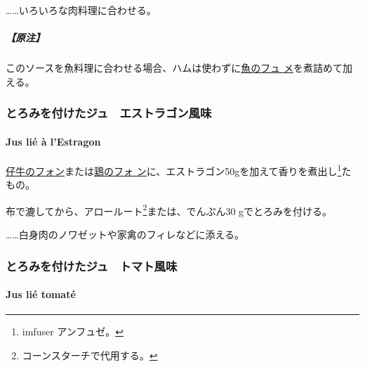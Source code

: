 \begin{recette}
\ldots{}\ldots{}いろいろな肉料理に合わせる。

\hypertarget{ux539fux6ce8-4}{%
\subparagraph{【原注】}\label{ux539fux6ce8-4}}

このソースを魚料理に合わせる場合、ハムは使わずに\protect\hyperlink{fumet-de-poisson}{魚のフュ
メ}を煮詰めて加える。

\maeaki

\hypertarget{ux3068ux308dux307fux3092ux4ed8ux3051ux305fux30b8ux30e5ux30a8ux30b9ux30c8ux30e9ux30b4ux30f3ux98a8ux5473}{%
\subsubsection{とろみを付けたジュ　エストラゴン風味}\label{ux3068ux308dux307fux3092ux4ed8ux3051ux305fux30b8ux30e5ux30a8ux30b9ux30c8ux30e9ux30b4ux30f3ux98a8ux5473}}

\hypertarget{jus-lie-a-lestragon}{%
\paragraph{Jus lié à l'Estragon}\label{jus-lie-a-lestragon}}

    

\protect\hyperlink{fonds-de-veau-brun}{仔牛のフォン}または\protect\hyperlink{fonds-de-volaille}{鶏のフォ
ン}に、エストラゴン50gを加えて香りを煮出し\footnote{imfuser アンフュゼ。}た
もの。

布で漉してから、アロールート\footnote{コーンスターチで代用する。}または、でんぷん30
gでとろみを付ける。

\ldots{}\ldots{}白身肉のノワゼットや家禽のフィレなどに添える。

\maeaki

\hypertarget{ux3068ux308dux307fux3092ux4ed8ux3051ux305fux30b8ux30e5ux30c8ux30deux30c8ux98a8ux5473}{%
\subsubsection{とろみを付けたジュ　トマト風味}\label{ux3068ux308dux307fux3092ux4ed8ux3051ux305fux30b8ux30e5ux30c8ux30deux30c8ux98a8ux5473}}

\hypertarget{jus-lie-tomate}{%
\paragraph{Jus lié tomaté}\label{jus-lie-tomate}}


\end{recette}
